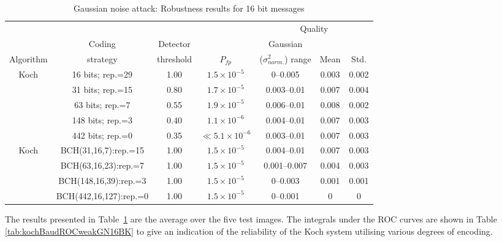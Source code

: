 \documentclass[12pt]{report}
\begin{document}
\begin{table}[htb]
\tiny
        \begin{center}
                \begin{tabular}{|c|c|c|c|c|c|c|} \hline
			& 	& 	& 		& \multicolumn{3}{c|}{Quality} \\ \cline{5-7}
			  & Coding   & Detector	 & 	    & Gaussian 			  & 	 & \\
                Algorithm & strategy & threshold & $P_{fp}$ & ($\sigma_{norm.}^{2}$) range & Mean &Std. \\\hline\hline
                Koch & 16 bits; rep.=29	     & 1.00     			& $1.5\times 10^{-5}$   &0--0.005       &0.003     &0.002     \\ \cline{2-7}
                	& 31 bits; rep.=15      & 0.80     			& $1.7\times 10^{-5}$   &0.003--0.01        &0.007     &0.004     \\ \cline{2-7}
                	& 63 bits; rep.=7       & 0.55     			& $1.9\times 10^{-5}$   &0.006--0.01        &0.008     &0.002     \\ \cline{2-7}
                	& 148 bits; rep.=3      & 0.40     			& $1.1\times 10^{-6}$   &0.004--0.01        &0.007     &0.003     \\ \cline{2-7}
                	& 442 bits; rep.=0      & 0.35     			& $\ll5.1\times 10^{-6}$&0.003--0.01        &0.007     &0.003   \\ \hline\hline
		
		Koch 	& BCH(31,16,7):rep.=15  & 1.00	& $1.5\times 10^{-5}$	& 0.004--0.01 		& 0.007		& 0.003	\\ \cline{2-7}
			& BCH(63,16,23):rep.=7  & 1.00	& $1.5\times 10^{-5}$	& 0.001--0.007		& 0.004		& 0.003 	\\ \cline{2-7}
			& BCH(148,16,39):rep.=3 & 1.00	& $1.5\times 10^{-5}$	& 0--0.003		& 0.001 	& 0.001 	\\ \cline{2-7}
			& BCH(442,16,127):rep.=0& 1.00	& $1.5\times 10^{-5}$	& 0--0.001 		& 0 	& 0 	\\ \hline
        \end{tabular}
	\caption{Gaussian noise attack: Robustness results for 16 bit messages}
        \label{tab:GNResBK}
        \end{center}
\normalsize
\end{table}
The results presented in Table~\ref{tab:GNResBK} are the average over the five test images.
The integrals under the ROC curves are shown in Table
\ref{tab:kochBaudROCweakGN16BK} to give an indication of the reliability of the Koch system 
utilising various degrees of encoding. 
\end{document}
